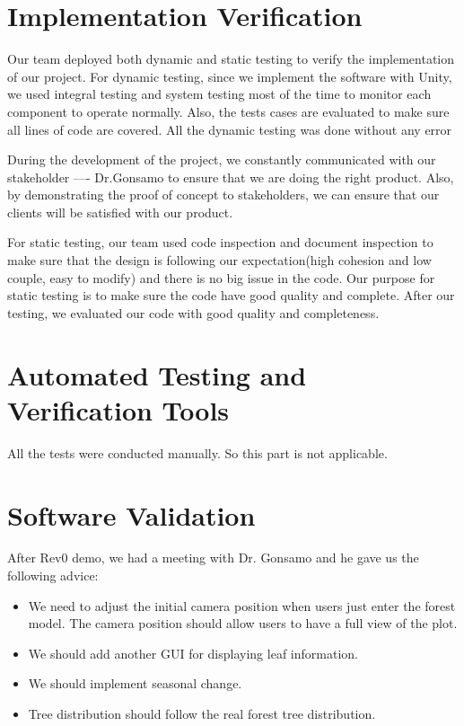\documentclass[12pt, titlepage]{article}
\begin{document}
\section{Implementation Verification}
Our team deployed both dynamic and static testing to verify the implementation of our project. For dynamic testing, since we implement the software with Unity, we used integral testing and system testing most of the time to monitor each component to operate normally. Also, the tests cases are evaluated to make sure all lines of code are covered. All the dynamic testing was done without any error 

During the development of the project, we constantly communicated with our stakeholder ---- Dr.Gonsamo to ensure that we are doing the right product. Also, by demonstrating the proof of concept to stakeholders, we can ensure that our clients will be satisfied with our product.

For static testing, our team used code inspection and document inspection to make sure that the design is following our expectation(high cohesion and low couple, easy to modify) and there is no big issue in the code. Our purpose for static testing is to make sure the code have good quality and complete. After our testing, we evaluated our code with good quality and completeness.

\section{Automated Testing and Verification Tools}
All the tests were conducted manually. So this part is not applicable.

\section{Software Validation}
After Rev0 demo, we had a meeting with Dr. Gonsamo and he gave us the following 
advice:
\begin{itemize}
\item We need to adjust the initial camera position when users just enter the 
forest model. The camera position should allow users to have a full view of the 
plot.
\item We should add another GUI for displaying leaf information.
\item We should implement seasonal change.
\item Tree distribution should follow the real forest tree distribution.
\end{itemize}
\end{document}
